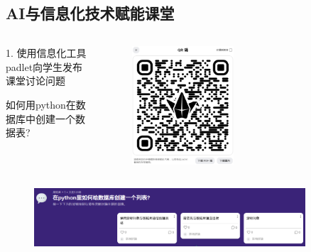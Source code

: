\documentclass{beamer}
\begin{document}
\subsection{AI与信息化技术赋能课堂}
\begin{frame}[t]
	\begin{columns}
		\begin{column}{0.5\textwidth}
			1. 使用信息化工具padlet向学生发布课堂讨论问题
			\pause
			\begin{example}
				如何用python在数据库中创建一个数据表?

			\end{example}
			\pause
		\end{column}
		\begin{column}{0.5\textwidth}
			\begin{figure}[htpb]
				\centering
				\includegraphics[width=0.5\textwidth]{QRcode.eps}
				\label{fig:}
			\end{figure}
		\end{column}
	\end{columns}
	\pause
	\begin{figure}[htpb]
		\centering
		\includegraphics[width=0.9\textwidth]{discussion.png}
		\label{fig:discussion}
	\end{figure}

\end{frame}
\end{document}
